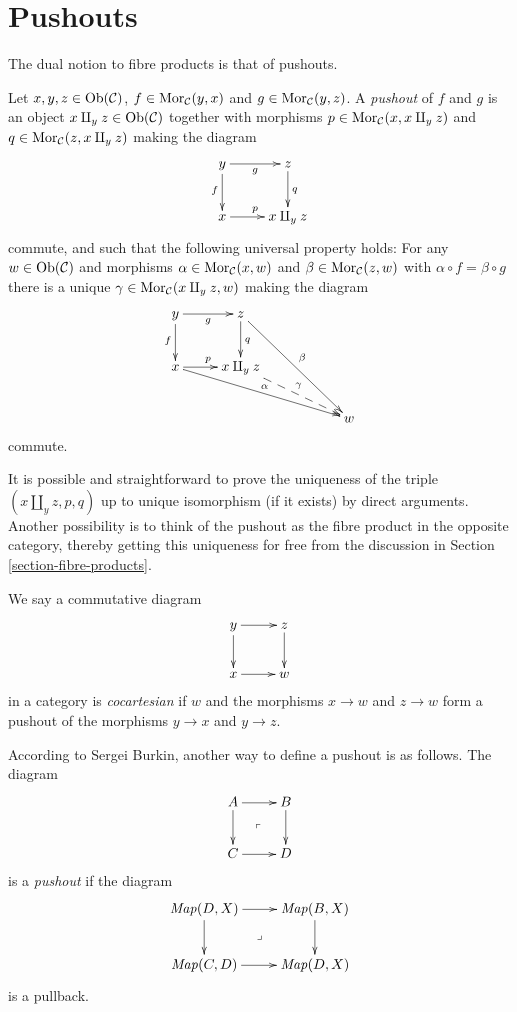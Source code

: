 \section{Pushouts}
\label{section-pushouts}

\noindent
The dual notion to fibre products is that of
pushouts.

\begin{definition}
\label{definition-pushouts}
Let $x, y, z\in \mathop{\mathrm{Ob}}\nolimits(\mathcal{C})$,
$f\in \mathop{\mathrm{Mor}}\nolimits_\mathcal{C}(y, x)$
and $g\in \mathop{\mathrm{Mor}}\nolimits_{\mathcal C}(y, z)$.
A {\it pushout} of $f$ and $g$ is
an object $x\amalg_y z\in \mathop{\mathrm{Ob}}\nolimits(\mathcal{C})$
together with morphisms
$p\in \mathop{\mathrm{Mor}}\nolimits_{\mathcal C}(x, x\amalg_y z)$ and
$q\in\mathop{\mathrm{Mor}}\nolimits_{\mathcal C}(z, x\amalg_y z)$
making the diagram
$$
\xymatrix{
y \ar[r]_g \ar[d]_f & z \ar[d]^q \\
x \ar[r]^p & x\amalg_y z
}
$$
commute, and such that the following
universal property holds:
For any $w\in \mathop{\mathrm{Ob}}\nolimits(\mathcal{C})$ and morphisms
$\alpha \in \mathop{\mathrm{Mor}}\nolimits_{\mathcal C}(x, w)$ and
$\beta \in \mathop{\mathrm{Mor}}\nolimits_\mathcal{C}(z, w)$ with
$\alpha \circ f = \beta \circ g$ there is a
unique
$\gamma\in \mathop{\mathrm{Mor}}\nolimits_{\mathcal C}(x\amalg_y z, w)$
making
the diagram
$$
\xymatrix{
y \ar[r]_g \ar[d]_f & z \ar[d]^q
\ar[rrdd]^\beta & & \\
x \ar[r]^p \ar[rrrd]^\alpha & x \amalg_y z
\ar@{-->}[rrd]^\gamma & & \\
& & & w
}
$$
commute.
\end{definition}

\noindent
It is possible and straightforward to prove
the uniqueness of the triple
$(x\amalg_y z, p, q)$ up to unique
isomorphism (if it exists) by direct
arguments. Another possibility is to think of
the pushout as the
fibre product in the opposite category,
thereby getting this uniqueness for
free from the discussion in Section
\ref{section-fibre-products}.

\begin{definition}
\label{definition-cocartesian}
We say a commutative diagram
$$
\xymatrix{
y \ar[r] \ar[d] & z \ar[d] \\
x \ar[r] & w
}
$$
in a category is {\it cocartesian} if $w$ and
the morphisms $x \to w$ and
$z \to w$ form a pushout of the morphisms $y
\to x$ and $y \to z$.
\end{definition}

\medskip\noindent
According to Sergei Burkin, another way
to define a pushout is as follows.
The diagram
$$
\xymatrix{
A\ar[r]\ar[d]\ar@{}[dr]|-{\ulcorner}&B\ar[d]
\\
C\ar[r]&D
}
$$
is a {\it pushout} if the diagram
$$
\xymatrix{
\mathit{Map}(D,X)\ar[r]\ar[d]\ar@{}[dr]|-
{\lrcorner}&
\mathit{Map}(B,X)\ar[d]\\
\mathit{Map}(C,D)\ar[r]&\mathit{Map}(D,X)
}
$$
is a pullback.

